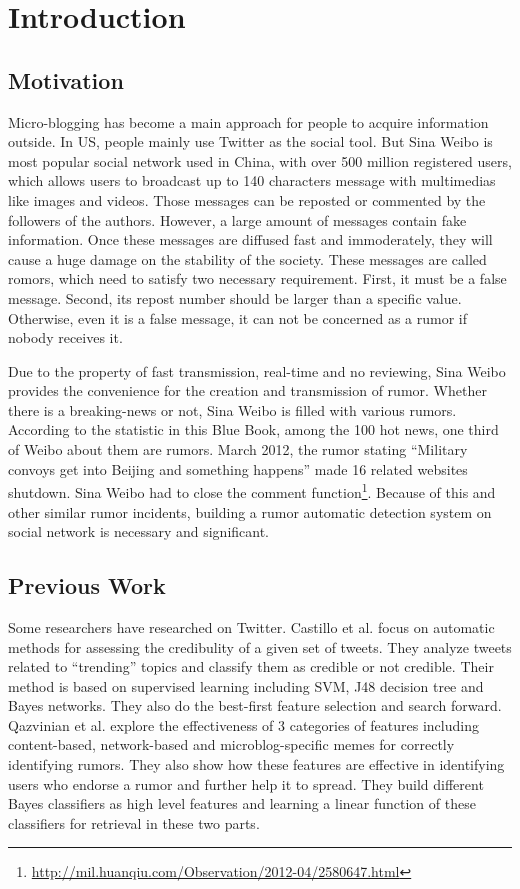\iffalse

\fi

\chapter{Introduction}
\section{Motivation}
Micro-blogging has become a main approach for people to acquire information outside. In US, people mainly use Twitter as the social tool. But Sina Weibo is most popular social network used in China, with over 500 million registered users, which allows users to broadcast up to 140 characters message with multimedias like images and videos. Those messages can be reposted or commented by the followers of the authors. However, a large amount of messages contain fake information. Once these messages are diffused fast and immoderately, they will cause a huge damage on the stability of the society. These messages are called romors, which need to satisfy two necessary requirement. First, it must be a false message. Second, its repost number should be larger than a specific value. Otherwise, even it is a false message, it can not be concerned as a rumor if nobody receives it. 

Due to the property of fast transmission, real-time and no reviewing, Sina Weibo provides the convenience for the creation and transmission of rumor. Whether there is a breaking-news or not, Sina Weibo is filled with various rumors. According to the statistic in this Blue Book\cite{Chinareport}, among the 100 hot news, one third of Weibo about them are rumors. March 2012, the rumor stating ``Military convoys get into Beijing and something happens'' made 16 related websites shutdown. Sina Weibo had to close the comment function\footnote{\url{http://mil.huanqiu.com/Observation/2012-04/2580647.html}}. Because of this and other similar rumor incidents, building a rumor automatic detection system on social network is necessary and significant.
\section{Previous Work}
Some researchers have researched on Twitter. Castillo et al.\cite{castillo2011information} focus on automatic methods for assessing the credibulity of a given set of tweets. They analyze tweets related to ``trending'' topics and classify them as credible or not credible. Their method is based on supervised learning including SVM, J48 decision tree and Bayes networks. They also do the best-first feature selection and search forward. Qazvinian et al.\cite{qazvinian2011rumor} explore the effectiveness of 3 categories of features including content-based, network-based and microblog-specific memes for correctly identifying rumors. They also show how these features are effective in identifying users who endorse a rumor and further help it to spread. They build different Bayes classifiers as high level features and learning a linear function of these classifiers for retrieval in these two parts.

